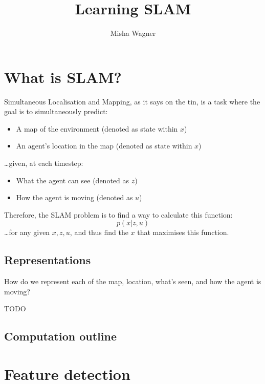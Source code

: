 \documentclass{article}
\title{Learning SLAM}
\author{Misha Wagner}
\begin{document}
\maketitle
\tableofcontents
\newpage


\section{What is SLAM?}

Simultaneous Localisation and Mapping, as it says on the tin, is a task where
the goal is to simultaneously predict:
\begin{itemize}
  \item A map of the environment (denoted as state within $x$)
  \item An agent's location in the map (denoted as state within $x$)
\end{itemize}
\dots given, at each timestep:
\begin{itemize}
  \item What the agent can see (denoted as $z$)
  \item How the agent is moving (denoted as $u$)
\end{itemize}

Therefore, the SLAM problem is to find a way to calculate this function:
\begin{equation}\label{slam}
  p(x \vert z, u)
\end{equation}
\dots for any given $x, z, u$, and thus find the $x$ that maximises this
function.

\subsection{Representations}

How do we represent each of the map, location, what's seen, and how the agent
is moving?

TODO

\subsection{Computation outline}

\section{Feature detection}
\end{document}
